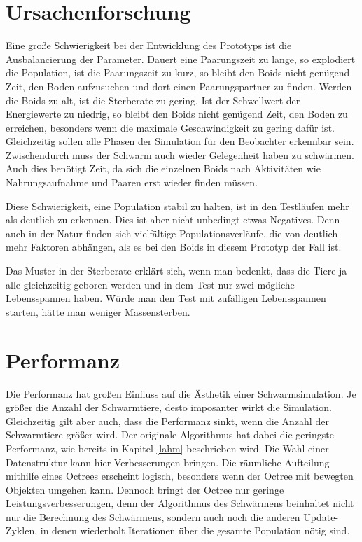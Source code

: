 \documentclass[draft=false
              ,paper=a4
              ,twoside=false
              ,fontsize=11pt
              ,headsepline
              ,BCOR10mm
              ,DIV11
              ,bibtotoc
              ,liststotoc
              ]{scrbook}
\begin{document}
\section{Ursachenforschung}
Eine große Schwierigkeit bei der Entwicklung des Prototyps ist die Ausbalancierung der Parameter. Dauert eine Paarungszeit zu lange, so explodiert die Population, ist die Paarungszeit zu kurz, so bleibt den Boids nicht genügend Zeit, den Boden aufzusuchen und dort einen Paarungspartner zu finden. Werden die Boids zu alt, ist die Sterberate zu gering. Ist der Schwellwert der Energiewerte zu niedrig, so bleibt den Boids nicht genügend Zeit, den Boden zu erreichen, besonders wenn die maximale Geschwindigkeit zu gering dafür ist. Gleichzeitig sollen alle Phasen der Simulation für den Beobachter erkennbar sein. Zwischendurch muss der Schwarm auch wieder Gelegenheit haben zu schwärmen. Auch dies benötigt Zeit, da sich die einzelnen Boids nach Aktivitäten wie Nahrungsaufnahme und Paaren erst wieder finden müssen.

Diese Schwierigkeit, eine Population stabil zu halten, ist in den Testläufen mehr als deutlich zu erkennen. Dies ist aber nicht unbedingt etwas Negatives. Denn auch in der Natur finden sich vielfältige Populationsverläufe, die von deutlich mehr Faktoren abhängen, als es bei den Boids in diesem Prototyp der Fall ist.

Das Muster in der Sterberate erklärt sich, wenn man bedenkt, dass die Tiere ja alle gleichzeitig geboren werden und in dem Test nur zwei mögliche Lebensspannen haben. Würde man den Test mit zufälligen Lebensspannen starten, hätte man weniger Massensterben.

\section{Performanz}
Die Performanz hat großen Einfluss auf die Ästhetik einer Schwarmsimulation. Je größer die Anzahl der Schwarmtiere, desto imposanter wirkt die Simulation. Gleichzeitig gilt aber auch, dass die Performanz sinkt, wenn die Anzahl der Schwarmtiere größer wird. Der originale Algorithmus hat dabei die geringste Performanz, wie bereits in Kapitel \ref{lahm} beschrieben wird. Die Wahl einer Datenstruktur kann hier Verbesserungen bringen. Die räumliche Aufteilung mithilfe eines Octrees erscheint logisch, besonders wenn der Octree mit bewegten Objekten umgehen kann. Dennoch bringt der Octree nur geringe Leistungsverbesserungen, denn der Algorithmus des Schwärmens beinhaltet nicht nur die Berechnung des Schwärmens, sondern auch noch die anderen Update-Zyklen, in denen wiederholt Iterationen über die gesamte Population nötig sind.
\end{document}
